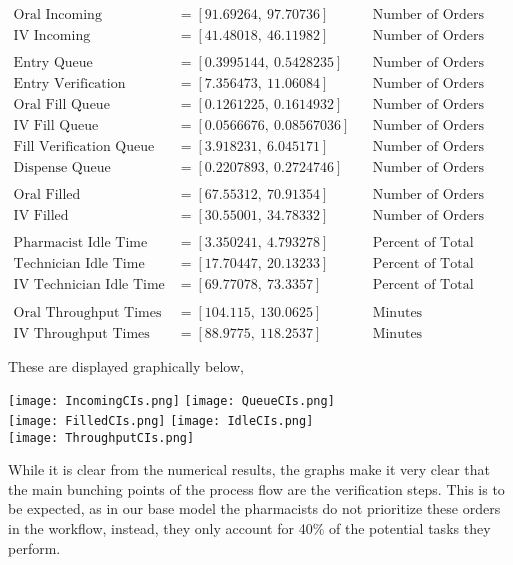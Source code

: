 \documentclass[letterpaper,10pt]{article}
\begin{document}
\begin{align*}
\text{Oral Incoming} &= [91.69264,\ 97.70736] && \text{Number of Orders}\\
\text{IV Incoming} &= [41.48018,\ 46.11982] && \text{Number of Orders}\\\\
\text{Entry Queue} &= [0.3995144,\ 0.5428235] && \text{Number of Orders}\\
\text{Entry Verification Queue} &= [7.356473,\ 11.06084] && \text{Number of Orders}\\
\text{Oral Fill Queue} &= [0.1261225,\ 0.1614932] && \text{Number of Orders}\\
\text{IV Fill Queue} &= [0.0566676,\ 0.08567036] && \text{Number of Orders}\\
\text{Fill Verification Queue} &= [3.918231,\ 6.045171] && \text{Number of Orders}\\
\text{Dispense Queue} &= [0.2207893,\ 0.2724746] && \text{Number of Orders}\\\\
\text{Oral Filled} &= [67.55312,\ 70.91354] && \text{Number of Orders}\\
\text{IV Filled} &= [30.55001,\ 34.78332] && \text{Number of Orders}\\\\
\text{Pharmacist Idle Time} &= [3.350241,\ 4.793278] && \text{Percent of Total Time}\\
\text{Technician Idle Time} &= [17.70447,\ 20.13233] && \text{Percent of Total Time}\\
\text{IV Technician Idle Time} &= [69.77078,\ 73.3357] && \text{Percent of Total Time}\\\\
\text{Oral Throughput Times} &= [104.115,\ 130.0625] && \text{Minutes}\\
\text{IV Throughput Times} &= [88.9775,\ 118.2537] && \text{Minutes}\\\\
\end{align*}
These are displayed graphically below,
\begin{center}
\texttt{[image: IncomingCIs.png]}
\texttt{[image: QueueCIs.png]}\\
\texttt{[image: FilledCIs.png]}
\texttt{[image: IdleCIs.png]}\\
\texttt{[image: ThroughputCIs.png]}
\end{center}
While it is clear from the numerical results, the graphs make it very clear that the main bunching points of the process flow are the verification steps. This is to be expected, as in our base model the pharmacists do not prioritize these orders in the workflow, instead, they only account for 40\% of the potential tasks they perform.\\\\
\end{document}
